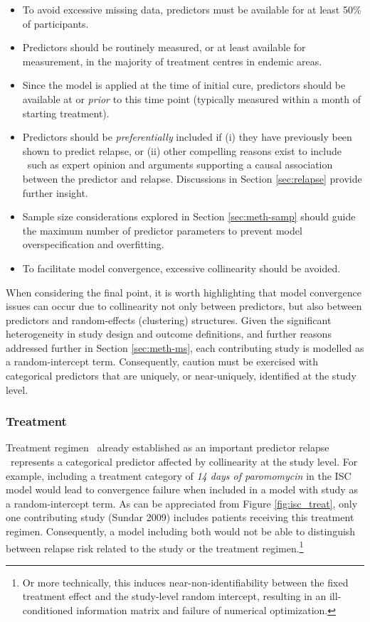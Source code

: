 \begin{itemize}[noitemsep]
  \item To avoid excessive missing data, predictors must be available for at least 50\% of participants.
  \item Predictors should be routinely measured, or at least available for measurement, in the majority of treatment centres in endemic areas.
  \item Since the model is applied at the time of initial cure, predictors should be available at or \textit{prior} to this time point (typically measured within a month of starting treatment).
  \item Predictors should be \textit{preferentially} included if (i) they have previously been shown to predict relapse, or (ii) other compelling reasons exist to include \textemdash\ such as expert opinion and arguments supporting a causal association between the predictor and relapse. Discussions in Section \ref{sec:relapse} provide further insight.
  \item Sample size considerations explored in Section \ref{sec:meth-samp} should guide the maximum number of predictor parameters to prevent model overspecification and overfitting.
  \item To facilitate model convergence, excessive collinearity should be avoided.
\end{itemize}

When considering the final point, it is worth highlighting that model convergence issues can occur due to collinearity not only between predictors, but also between predictors and random-effects (clustering) structures. Given the significant heterogeneity in study design and outcome definitions, and further reasons addressed further in Section \ref{sec:meth-ms}, each contributing study is modelled as a random-intercept term. Consequently, caution must be exercised with categorical predictors that are uniquely, or near-uniquely, identified at the study level.

\subsubsection{Treatment}

Treatment regimen \textemdash\ already established as an important predictor relapse \textemdash\ represents a categorical predictor affected by collinearity at the study level. For example, including a treatment category of \textit{14 days of paromomycin} in the ISC model would lead to convergence failure when included in a model with study as a random-intercept term. As can be appreciated from Figure \ref{fig:isc_treat}, only one contributing study (Sundar 2009) includes patients receiving this treatment regimen. Consequently, a model including both would not be able to distinguish between relapse risk related to the study or the treatment regimen.\footnote{Or more technically, this induces near-non-identifiability between the fixed treatment effect and the study-level random intercept, resulting in an ill-conditioned information matrix and failure of numerical optimization.}

